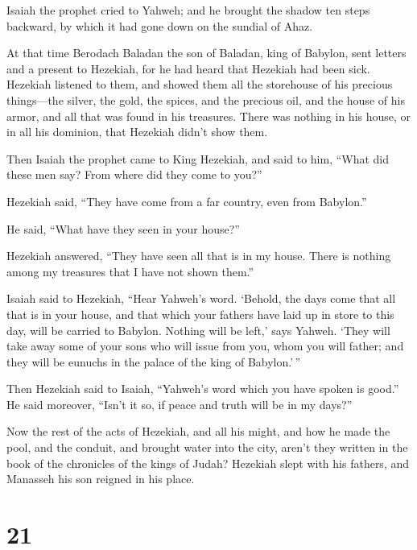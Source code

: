  Isaiah the prophet cried to Yahweh; and he brought the
shadow ten steps backward, by which it had gone down on the sundial of
Ahaz.

 At that time Berodach Baladan the son of Baladan, king
of Babylon, sent letters and a present to Hezekiah, for he had heard
that Hezekiah had been sick.  Hezekiah listened to them,
and showed them all the storehouse of his precious things---the silver,
the gold, the spices, and the precious oil, and the house of his armor,
and all that was found in his treasures. There was nothing in his house,
or in all his dominion, that Hezekiah didn't show them.

 Then Isaiah the prophet came to King Hezekiah, and said
to him, ``What did these men say? From where did they come to you?''

Hezekiah said, ``They have come from a far country, even from Babylon.''

 He said, ``What have they seen in your house?''

Hezekiah answered, ``They have seen all that is in my house. There is
nothing among my treasures that I have not shown them.''

 Isaiah said to Hezekiah, ``Hear Yahweh's word.
 `Behold, the days come that all that is in your house,
and that which your fathers have laid up in store to this day, will be
carried to Babylon. Nothing will be left,' says Yahweh. 
`They will take away some of your sons who will issue from you, whom you
will father; and they will be eunuchs in the palace of the king of
Babylon.'\,''

 Then Hezekiah said to Isaiah, ``Yahweh's word which you
have spoken is good.'' He said moreover, ``Isn't it so, if peace and
truth will be in my days?''

 Now the rest of the acts of Hezekiah, and all his might,
and how he made the pool, and the conduit, and brought water into the
city, aren't they written in the book of the chronicles of the kings of
Judah?  Hezekiah slept with his fathers, and Manasseh his
son reigned in his place.

\hypertarget{section-20}{%
\section{21}\label{section-20}}

